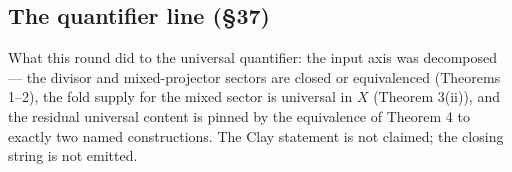 \documentclass[11pt]{article}
\begin{document}
\subsection*{The quantifier line (\S37)}

What this round did to the universal quantifier: the input axis was decomposed
--- the divisor and mixed-projector sectors are closed or equivalenced
(Theorems 1--2), the fold supply for the mixed sector is universal in $X$
(Theorem 3(ii)), and the residual universal content is pinned by the
equivalence of Theorem 4 to exactly two named constructions. The Clay
statement is not claimed; the closing string is not emitted.
\end{document}
